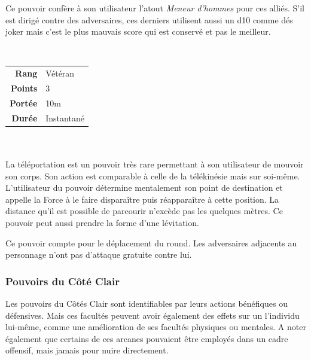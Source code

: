 \begin{description}[align=left]
        Ce pouvoir confère à son utilisateur l'atout \emph{Meneur d’hommes} pour ces alliés. S'il est dirigé contre des adversaires, ces derniers utilisent aussi un d10 comme dés joker mais c'est le plus mauvais score qui est conservé et pas le meilleur.
        \\

    \item [Téléportation] ~ \\

        \begin{tabular}{ r l }
            \textbf{Rang}    & Vétéran \\
            \textbf{Points}  & 3 \\
            \textbf{Portée}  & 10m \\
            \textbf{Durée}   & Instantané \\
        \end{tabular}
        \\ \\
        La téléportation est un pouvoir très rare permettant à son utilisateur de mouvoir son corps. Son action est comparable à celle de la télékinésie mais sur soi-même. L'utilisateur du pouvoir détermine mentalement son point de destination et appelle la Force à le faire disparaître puis réapparaître à cette position. La distance qu'il est possible de parcourir n'excède pas les quelques mètres. Ce pouvoir peut aussi prendre la forme d'une lévitation.

        Ce pouvoir compte pour le déplacement du round. Les adversaires adjacents au personnage n’ont pas d’attaque gratuite contre lui.
        \\

\end{description}

\subsubsection{Pouvoirs du Côté Clair}

Les pouvoirs du Côtés Clair sont identifiables par leurs actions bénéfiques ou défensives. Mais ces facultés peuvent avoir également des effets sur un l'individu lui-même, comme une amélioration de ses facultés physiques ou mentales. A noter également que certains de ces arcanes pouvaient être employés dans un cadre offensif, mais jamais pour nuire directement. 

